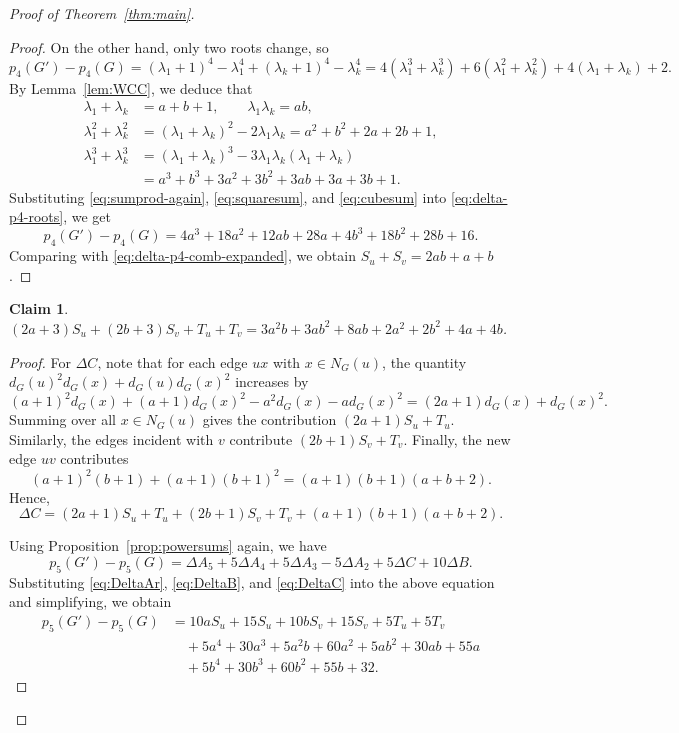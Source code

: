 \documentclass[11pt]{amsart}
\numberwithin{equation}{section}
\newtheorem{claim}{Claim}
\begin{document}
\begin{proof}[Proof of Theorem~\ref{thm:main}]
\begin{proof}
On the other hand, only two roots change, so
\begin{equation}\label{eq:delta-p4-roots}
p_4(G')-p_4(G)
=(\lambda_1+1)^4-\lambda_1^4+(\lambda_k+1)^4-\lambda_k^4
=4(\lambda_1^3+\lambda_k^3)+6(\lambda_1^2+\lambda_k^2)+4(\lambda_1+\lambda_k)+2.
\end{equation}
By Lemma~\ref{lem:WCC}, we deduce that
\begin{align}\label{eq:sumprod-again}
\lambda_1+\lambda_k & = a+b+1, \qquad \lambda_1\lambda_k=ab, \\
\lambda_1^2+\lambda_k^2
& = (\lambda_1+\lambda_k)^2-2\lambda_1\lambda_k = a^2+b^2+2a+2b+1, \label{eq:squaresum} \\
\lambda_1^3+\lambda_k^3
& = (\lambda_1+\lambda_k)^3-3\lambda_1\lambda_k(\lambda_1+\lambda_k) \label{eq:cubesum} \\ 
& = a^3+b^3+3a^2+3b^2+3ab+3a+3b+1. \nonumber
\end{align}
Substituting \eqref{eq:sumprod-again}, \eqref{eq:squaresum}, and \eqref{eq:cubesum} into \eqref{eq:delta-p4-roots}, we get
\[
p_4(G')-p_4(G) = 4a^3+18a^2+12ab+28a + 4b^3+18b^2+28b+16.
\]
Comparing with \eqref{eq:delta-p4-comb-expanded}, we obtain $S_u+S_v=2ab+a+b$.
\end{proof}

\begin{claim}\label{claim-2}
$(2a {+} 3)S_u {+} (2b {+} 3)S_v {+} T_u {+} T_v = 3a^2b {+} 3ab^2 {+} 8ab {+} 2a^2 {+} 2b^2 {+} 4a {+} 4b$.
\end{claim}

\begin{proof}
For $\Delta C$, note that for each edge $ux$ with $x\in N_G(u)$, the quantity
$d_G(u)^2d_G(x)+d_G(u)d_G(x)^2$ increases by
\[
(a+1)^2d_G(x)+(a+1)d_G(x)^2-a^2d_G(x)-ad_G(x)^2
=(2a+1)d_G(x)+d_G(x)^2.
\]
Summing over all $x\in N_G(u)$ gives the contribution $(2a+1)S_u+T_u$.
Similarly, the edges incident with $v$ contribute $(2b+1)S_v+T_v$.
Finally, the new edge $uv$ contributes
\[
(a+1)^2(b+1)+(a+1)(b+1)^2=(a+1)(b+1)(a+b+2).
\]
Hence,
\begin{equation}\label{eq:DeltaC}
\Delta C=(2a+1)S_u+T_u+(2b+1)S_v+T_v+(a+1)(b+1)(a+b+2).
\end{equation}

Using Proposition~\ref{prop:powersums} again, we have
\[
p_5(G')-p_5(G)=\Delta A_5+5\Delta A_4+5\Delta A_3-5\Delta A_2+5\Delta C+10\Delta B.
\]
Substituting \eqref{eq:DeltaAr}, \eqref{eq:DeltaB}, and \eqref{eq:DeltaC} 
into the above equation and simplifying, we obtain
\begin{equation}\label{eq:delta-p5-comb-expanded}
\begin{split}
p_5(G')-p_5(G)
& = 10aS_u+15S_u+10bS_v+15S_v+5T_u+5T_v \\
& \quad+5a^4+30a^3+5a^2b+60a^2+5ab^2+30ab+55a \\
& \quad+5b^4+30b^3+60b^2+55b+32.
\end{split}
\end{equation}


\end{proof}
\end{proof}
\end{document}

